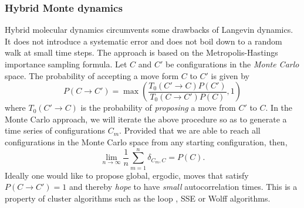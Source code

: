 

\subsubsection{Hybrid  Monte  dynamics} \label{sec:hmc}

Hybrid molecular  dynamics  circumvents some  drawbacks of Langevin dynamics.  It does not introduce a systematic error and  does not boil down to a random walk  at small time steps.   The approach is based on the Metropolis-Hastings   importance sampling formula.  Let $C$ and $C'$  be  configurations  in the {\it Monte Carlo} space.  The probability of accepting a move form $C$ to $C'$ is given by
\begin{equation}
	  P(C \rightarrow C')  = \max \left(    \frac{T_0(C' \rightarrow C) P(C')}{T_0(C \rightarrow C') P(C) }, 1 \right)  
\end{equation}
where  $T_0(C' \rightarrow C)$ is the probability of { \it proposing}  a move from  $C'$ to $C$.     In the Monte Carlo approach,  we will iterate the above procedure  so as to generate a time series of configurations  $C_m$. Provided that we are able to reach all configurations in the Monte Carlo space from any  starting  configuration, then,
\begin{equation}
    \lim_{n \rightarrow \infty } \frac{1}{n}  \sum_{m=1}^{n}  \delta_{C_m,C}      = P(C).
\end{equation}  
Ideally one would like to propose global, ergodic,  moves that satisfy  $P(C \rightarrow C') =1$ and thereby {\it hope} to have {\it small} autocorrelation times.  This is a property of cluster algorithms such as  the loop \cite{Assaad08_rev}, SSE  \cite{Sandvik99b} or Wolff \cite{Wolff89} algorithms.    


